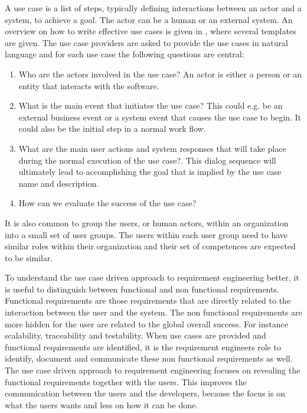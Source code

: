 \documentclass[11pt, oneside]{article}   	%
\begin{document}
A use case is a list of steps, typically defining interactions between an actor and a system, to achieve a goal. The actor can be a human or an external system.  An overview on how to write effective use cases is given in \cite{Coc01}, where several templates are given. The use case providers are asked to provide the use cases in natural language and for each use case the following questions are central:

\begin{enumerate}
\item Who are the actors involved in the use case? An actor is either a person or an entity that interacts with the software.  
\item What is the main event that initiates the use case? This could e.g. be an external business event or a system event that causes the use case to begin.  It could also be the initial step in a normal work flow. 
\item What are the main user actions and system responses that will take place during the normal execution of the use case?. This dialog sequence will ultimately lead to accomplishing the goal that is implied by the use case name and description.
\item How can we evaluate the success of the use case?
\end{enumerate}
 
It is also common to group the users, or human actors, within an organization into a small set of user groups. The users within each user group need to have similar roles within their organization and their set of competences are expected to be similar. 

To understand the use case driven approach to requirement engineering better, it is useful to distinguish between functional and non functional requirements.  Functional requirements are those requirements that are directly related to the interaction between the user and the system.  The non functional requirements are more hidden for the user are related to the global overall success.  For instance scalability, traceability and testability.  When use cases are provided and functional requirements are identified, it is the requirement engineers role to identify, document and communicate these non functional requirements as well.  The use case driven approach to requirement engineering focuses on revealing the functional requirements together with the users.  This improves the communication between the users and the developers, because the focus is on what the users wants and less on how it can be done.
\end{document}
